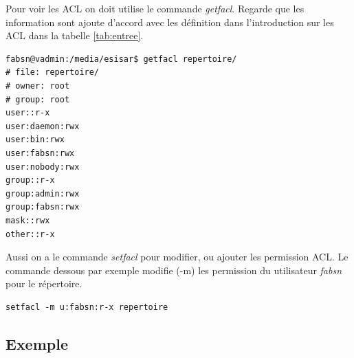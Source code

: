 Pour voir les ACL on doit utilise le commande \emph{getfacl}. Regarde que les information sont ajoute d'accord avec les définition dans l'introduction sur les ACL dans la tabelle \ref{tab:entree}. 

\begin{verbatim}
fabsn@vadmin:/media/esisar$ getfacl repertoire/
# file: repertoire/
# owner: root
# group: root
user::r-x
user:daemon:rwx
user:bin:rwx
user:fabsn:rwx
user:nobody:rwx
group::r-x
group:admin:rwx
group:fabsn:rwx
mask::rwx
other::r-x	
\end{verbatim}

Aussi on a le commande \emph{setfacl} pour modifier, ou ajouter les permission ACL. Le commande dessous par exemple modifie (-m) les permission du utilisateur \emph{fabsn} pour le répertoire. 

\begin{verbatim}
setfacl -m u:fabsn:r-x repertoire
\end{verbatim}

\subsection*{Exemple}

